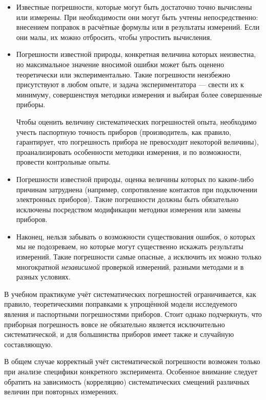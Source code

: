\begin{itemize}\small
    \item Известные погрешности, которые могут быть достаточно точно вычислены
или измерены. При необходимости они могут быть учтены непосредственно:
внесением поправок в расчётные формулы или в результаты измерений.
Если они малы, их можно отбросить, чтобы упростить вычисления.

    \item Погрешности известной природы, конкретная величина которых неизвестна,
но максимальное значение вносимой ошибки может быть оценено теоретически
или экспериментально. Такие погрешности неизбежно присутствуют в любом
опыте, и задача экспериментатора --- свести их к минимуму,
совершенствуя методики измерения и выбирая более совершенные приборы.

    Чтобы оценить величину систематических погрешностей опыта, необходимо
учесть паспортную точность приборов (производитель, как правило, гарантирует,
что погрешность прибора не превосходит некоторой величины), проанализировать
особенности методики измерения, и по возможности, провести контрольные
опыты.

    \item Погрешности известной природы, оценка величины которых по каким-либо
причинам затруднена (например, сопротивление контактов при подключении
электронных приборов). Такие погрешности должны быть обязательно исключены
посредством модификации методики измерения или замены приборов.

    \item Наконец, нельзя забывать о возможности существования ошибок, о
которых мы не подозреваем, но которые могут существенно искажать результаты
измерений. Такие погрешности самые опасные, а исключить их можно только
многократной \emph{независимой} проверкой измерений, разными методами
и в разных условиях.
\end{itemize}

В учебном практикуме учёт систематических погрешностей ограничивается,
как правило, теоретическими поправками
к упрощённой модели исследуемого явления и паспортными погрешностями приборов.
Стоит однако подчеркнуть, что приборная погрешность вовсе не обязательно является исключительно систематической, и для большинства приборов имеет также и случайную составляющую.

В общем случае корректный учёт систематической погрешности возможен только при анализе специфики конкретного эксперимента. Особенное внимание следует обратить на зависимость (корреляцию) систематических смещений различных величин 
при повторных измерениях. 

